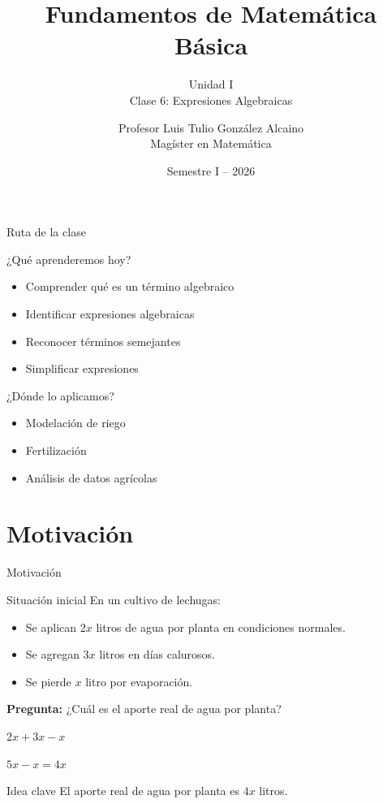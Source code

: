 \documentclass[aspectratio=169,12pt]{beamer}
\title[Fundamentos de Matemática Básica]{Fundamentos de Matemática Básica}
\subtitle{Unidad I \\ Clase 6: Expresiones Algebraicas}
\author{Profesor Luis Tulio González Alcaino \\ \small Magíster en Matemática}
\institute{Universidad Santo Tomás \\ Departamento Ciencias Básicas -- Talca}
\date{Semestre I -- 2026}
\newcommand{\IdeaClave}[1]{
	\begin{alertblock}{Idea clave}
		#1
	\end{alertblock}
}
\begin{document}
	
	\begin{frame}
		\titlepage
	\end{frame}
	
\begin{frame}{Ruta de la clase}
	
	\begin{block}{¿Qué aprenderemos hoy?}
		\begin{itemize}[<+->]
			\item Comprender qué es un término algebraico
			\item Identificar expresiones algebraicas
			\item Reconocer términos semejantes
			\item Simplificar expresiones
		\end{itemize}
	\end{block}
	
	\pause
	
	\begin{exampleblock}{¿Dónde lo aplicamos?}
		\begin{itemize}[<+->]
			\item Modelación de riego
			\item Fertilización
			\item Análisis de datos agrícolas
		\end{itemize}
	\end{exampleblock}
	
\end{frame}

	\section{Motivación}
	\begin{frame}{Motivación}
		\begin{block}{Situación inicial}
			En un cultivo de lechugas:
			\begin{itemize}
				\item Se aplican \(2x\) litros de agua por planta en condiciones normales.
				\pause
				\item Se agregan \(3x\) litros en días calurosos.
				\pause
				\item Se pierde \(x\) litro por evaporación.
			\end{itemize}
		\end{block}
		
		\pause
		\textbf{Pregunta:} ¿Cuál es el aporte real de agua por planta?
		
		\pause
		$
		2x+3x-x
		$
		
		\pause
		$
		5x-x=4x
		$
		
		\pause
		\IdeaClave{El aporte real de agua por planta es \(4x\) litros.}
	\end{frame}
	
\end{document}
